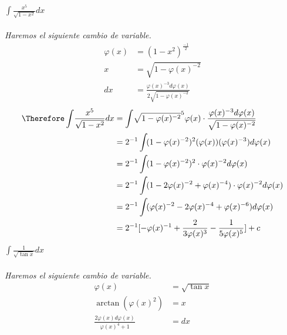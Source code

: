 \documentclass{article}
\newcommand{\ints}{\displaystyle \int \!}
\newcommand{\phix}{\varphi (x)}
\begin{document}
\newpage
$\ints \frac{x^5}{\sqrt{1-x^2}}dx$ \\\\
\textit{Haremos el siguiente cambio de variable.} \\
\begin{align*}
\phix &= (1-x^2)^{\frac{-1}{2}} \\
x &= \sqrt{1- \phix^{-2}} \\
dx &= \frac{\phix^{-3}d\phix}{2\sqrt{1-\phix^{-2}}}
\end{align*}
\begin{align*}
    \Therefore \ints \frac{x^5}{\sqrt{1-x^2}}dx &= \ints \sqrt{1- \phix^{-2}}^5 \phix \cdot \frac{\phix^{-3}d\phix}{\sqrt{1-\phix^{-2}}} \\
    &= 2^{-1} \ints (1- \phix^{-2})^2(\phix)(\phix^{-3})d\phix \\
    &= 2^{-1} \ints (1- \phix^{-2})^2 \cdot \phix^{-2} d\phix \\
    &= 2^{-1} \ints (1- 2\phix^{-2} + \phix^{-4}) \cdot \phix^{-2} d\phix \\
    &= 2^{-1} \ints (\phix^{-2} - 2\phix^{-4} + \phix^{-6}) d\phix \\
    &= 2^{-1} [-\phix^{-1} + \frac{2}{3\phix^{3}} - \frac{1}{5\phix^{5}}] + c
\end{align*}
\newpage
$\ints \frac{1}{\sqrt{\tan x}} dx$ \\\\
\textit{Haremos el siguiente cambio de variable.}\\
\begin{align*}
    \phix &=  \sqrt{\tan x} \\
    \arctan (\phix^2) &= x \\
    \frac{2\phix d\phix}{\phix^4 + 1} &= dx
\end{align*}
\end{document}
